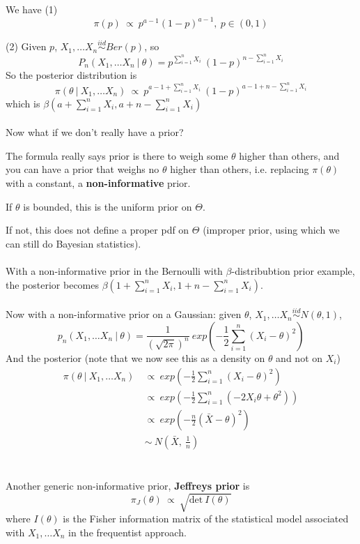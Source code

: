 \documentclass{article}
\begin{document}
We have
(1)
$$
\pi(p) ~ \propto ~ p^{a - 1} (1 - p)^{a - 1}, ~ p \in (0, 1)
$$

(2) Given $p$, $X_1, \dots X_n \overset{iid}{\sim} Ber(p)$, so
$$
P_n(X_1, \dots X_n ~ | ~ \theta) = p^{\sum_{i = 1}^{n} X_i} ~ (1 - p)^{n - \sum_{i = 1}^{n} X_i}
$$
So the posterior distribution is
$$
\pi(\theta ~ | ~ X_1, \dots X_n) ~ \propto ~ p^{a - 1 + \sum_{i = 1}^{n} X_i} ~ (1 - p)^{a - 1 + n - \sum_{i = 1}^{n} X_i}
$$
which is $\beta(a + \sum_{i = 1}^{n} X_i, a + n - \sum_{i = 1}^{n} X_i)$
\\
\\

Now what if we don't really have a prior?

The formula really says prior is there to weigh some $\theta$ higher than others,
and you can have a prior that weighs no $\theta$ higher than others,
i.e. replacing $\pi(\theta)$ with a constant,
a \textbf{non-informative} prior.

If $\theta$ is bounded, this is the uniform prior on $\Theta$.

If not, this does not define a proper pdf on $\Theta$
(improper prior, using which we can still do Bayesian statistics).
\\
\\
With a non-informative prior in the Bernoulli with $\beta$-distribubtion prior example,
the posterior becomes $\beta(1 + \sum_{i = 1}^{n} X_i, 1 + n - \sum_{i = 1}^{n} X_i)$.
\\
\\
Now with a non-informative prior on a Gaussian: given $\theta$, $X_1, \dots X_n \overset{iid}{\sim} \mathit{N}(\theta, 1)$,
$$
p_n(X_1, \dots X_n ~ | ~ \theta) = \frac{1}{(\sqrt{2 \pi})^n} ~ exp(- \frac{1}{2} \sum_{i = 1}^{n} (X_i - \theta)^2)
$$
And the posterior (note that we now see this as a density on $\theta$ and not on $X_i$)
\begin{align*}
\pi(\theta ~ | ~ X_1, \dots X_n) ~ &\propto ~ exp(- \frac{1}{2} \sum_{i = 1}^{n} (X_i - \theta)^2) \\
                                   &\propto ~ exp(- \frac{1}{2} \sum_{i = 1}^{n} (-2 X_i \theta + \theta^2)) \\
                                   &\propto ~ exp(- \frac{n}{2} (\bar{X} - \theta)^2) \\
                                   &\sim ~ \mathit{N}(\bar{X}, ~ \frac{1}{n})
\end{align*}
\\
\\
Another generic non-informative prior, \textbf{Jeffreys prior} is
$$
\pi_{J}(\theta) ~ \propto ~ \sqrt{\text{det}~I(\theta)}
$$
where $I(\theta)$ is the Fisher information matrix of the statistical model associated with $X_1, \dots X_n$ in the frequentist approach.
\end{document}
